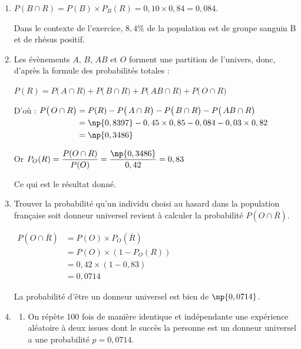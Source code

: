 \begin{enumerate}
\emph{Remarque :} les deux probabilités en rouge n'étaient pas attendues ici. On peut compléter ces deux branches après avoir répondu à la question \textbf{3.}

\item  $P(B \cap R)=P(B) \times P_B(R)= 0,10 \times 0,84=0,084$.

Dans le contexte de l'exercice, $8,4\%$ de la population est de groupe sanguin B et de rhésus positif.

\item   Les évènements $A$, $B$, $AB$  et $O$ forment une partition de l'univers, donc, d'après la formule des probabilités totales :

\quad $P(R) = P\big(\,A\cap R\big) + P\big(\,B\cap R\big) +  P\big(\,AB\cap R\big) +P\big(\,O\cap R\big) $

D'où :\quad 
$\begin{aligned}[t] P\big(\,O\cap R\big)&  = P(R)  -P\big(\,A\cap R\big) - P\big(\,B\cap R\big) -  P\big(\,AB\cap R\big) \\
	&= \np{0,8397} - 0,45\times 0,85 - 0,084 - 0,03 \times 0,82\\
	& = \np{0,3486}
\end{aligned}$

Or $P_O(R)=\dfrac{P(O\cap R) }{P(O)}= \dfrac{\np{0,3486}}{0,42}= 0,83$

Ce qui est le résultat donné.

\item Trouver  la probabilité qu'un individu choisi au hasard dans la population française soit donneur universel  revient à calculer la probabilité  $P\left( O\cap \overline{R} \right)$.

$\begin{aligned} P\left( O\cap \overline{R} \right)& = P(O)\times P_{O}\left(\overline{R}\right)\\
	&= P(O)\times \left(1- P_{O}(R)\right)\\
	&= 0,42 \times (1 - 0,83)\\
	&= 0,0714
\end{aligned}$

La probabilité d'être un donneur universel est bien  de $\np{0,0714}$.

\item
	\begin{enumerate}
		\item  On répète 100 fois de manière identique et indépendante une expérience aléatoire à deux issues dont le succès \og la personne est un donneur universel\fg{}  a une probabilité $p=0,0714$.


\end{enumerate}
\end{enumerate}
